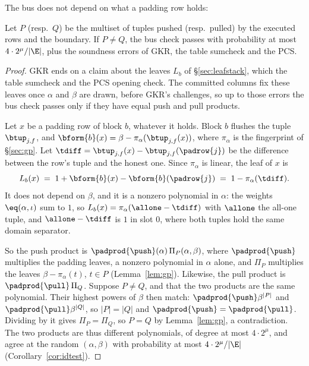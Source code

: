 The bus does not depend on what a padding row holds:

\begin{proposition}\label{prop:pad}
Let $P$ (resp.\ $Q$) be the multiset of tuples pushed (resp.\ pulled) by the executed rows and the boundary. If $P\neq Q$, the bus check passes with probability at most $4\cdot2^{\mu}/|\E|$, plus the soundness errors of GKR, the table sumcheck and the PCS.
\end{proposition}

\begin{proof}
GKR ends on a claim about the leaves $L_b$ of \S\ref{sec:leafstack}, which the table sumcheck and the PCS opening check. The committed columns fix these leaves once $\alpha$ and $\beta$ are drawn, before GKR's challenges, so up to those errors the bus check passes only if they have equal push and pull products.

Let $x$ be a padding row of block $b$, whatever it holds. Block $b$ flushes the tuple $\btup_{j,f}$, and $\bform{b}(x)=\beta-\pi_\alpha(\btup_{j,f}(x))$, where $\pi_\alpha$ is the fingerprint of \S\ref{sec:gp}. Let $\tdiff=\btup_{j,f}(x)-\btup_{j,f}(\padrow{j})$ be the difference between the row's tuple and the honest one. Since $\pi_\alpha$ is linear, the leaf of $x$ is
\[
  L_b(x)\;=\;1+\bform{b}(x)-\bform{b}(\padrow{j})\;=\;1-\pi_\alpha(\tdiff).
\]
It does not depend on $\beta$, and it is a nonzero polynomial in $\alpha$: the weights $\eq(\alpha,\iota)$ sum to $1$, so $L_b(x)=\pi_\alpha(\allone-\tdiff)$ with $\allone$ the all-one tuple, and $\allone-\tdiff$ is $1$ in slot $0$, where both tuples hold the same domain separator.

So the push product is $\padprod{\push}(\alpha)\,\Pi_P(\alpha,\beta)$, where $\padprod{\push}$ multiplies the padding leaves, a nonzero polynomial in $\alpha$ alone, and $\Pi_P$ multiplies the leaves $\beta-\pi_\alpha(t)$, $t\in P$ (Lemma~\ref{lem:gp}). Likewise, the pull product is $\padprod{\pull}\,\Pi_Q$. Suppose $P\neq Q$, and that the two products are the same polynomial. Their highest powers of $\beta$ then match: $\padprod{\push}\beta^{|P|}$ and $\padprod{\pull}\beta^{|Q|}$, so $|P|=|Q|$ and $\padprod{\push}=\padprod{\pull}$. Dividing by it gives $\Pi_P=\Pi_Q$, so $P=Q$ by Lemma~\ref{lem:gp}, a contradiction. The two products are thus different polynomials, of degree at most $4\cdot2^{\mu}$, and agree at the random $(\alpha,\beta)$ with probability at most $4\cdot2^{\mu}/|\E|$ (Corollary~\ref{cor:idtest}).
\end{proof}


